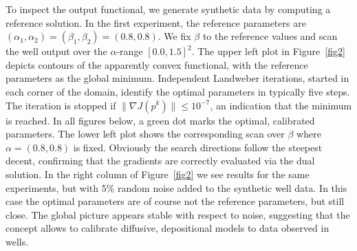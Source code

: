 To inspect the output functional, we generate synthetic data by
computing a reference solution.  In the first experiment, the
reference parameters are
$(\alpha_1, \alpha_2)=(\beta_1, \beta_2)=(0.8,0.8)$.  We fix $\beta$
to the reference values and scan the well output over the
$\alpha$-range $[0.0, 1.5]^2$. The upper left plot in
Figure~\ref{fig2} depicts contours of the apparently convex
functional, with the reference parameters as the global minimum.
Independent Landweber iterations, started in each corner of the domain,
identify the optimal parameters in typically five steps.  The
iteration is stopped if $\| \nabla J(p^k) \| \le 10^{-7}$, an
indication that the minimum is reached.  In all figures below, a green
dot marks the optimal, calibrated parameters.  The lower left plot
shows the corresponding scan over $\beta$ where $\alpha=(0.8,0.8)$ is
fixed.  Obviously the search directions follow the steepest decent,
confirming that the gradients are correctly evaluated via the dual
solution.  In the right column of Figure~\ref{fig2} we see results for
the same experiments, but with 5\% random noise added to the synthetic
well data. In this case the optimal parameters are of course not the
reference parameters, but still close.  The global picture appears
stable with respect to noise, suggesting that the concept allows to
calibrate diffusive, depositional models to data observed in wells.

